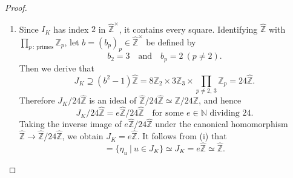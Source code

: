 \documentclass[10pt,a4paper]{amsart}
\begin{document}
\begin{proof}
\begin{enumerate}
\begin{align*}
&=\prod_{i=1}^r[\eta_{u_i},\,\sigma_i]\quad\textrm{by \eqref{etasigma}}\\
&\in [\mathcal{G}_K,\,\mathcal{G}_K].
\end{align*}
This shows that $M\subseteq[\mathcal{G}_K,\,\mathcal{G}_K]$, and hence
\begin{equation*}
[\mathcal{G}_K,\,\mathcal{G}_K]=M=\{\eta_u~|~u\in J_K\}. 
\end{equation*}
\item[(ii)]
Since $I_K$ has index $2$ in $\widehat{\mathbb{Z}}^{\times}$, it contains every square.
Identifying $\widehat{\mathbb{Z}}$ with 
$\prod_{p\,:\,\textrm{primes}}\mathbb{Z}_p$, 
let $b=(b_p)_p\in\widehat{\mathbb{Z}}^{\times}$ be defined by
\begin{equation*}
b_2=3\quad\textrm{and}\quad
b_p=2~(p\neq2).
\end{equation*}
Then we derive that
\begin{equation*}
J_K\supseteq(b^2-1)\widehat{\mathbb{Z}}=
8\mathbb{Z}_2\times3\mathbb{Z}_3
\times\prod_{p\neq2,\,3}\mathbb{Z}_p=
24\widehat{\mathbb{Z}}.
\end{equation*}
Therefore $J_K/24\widehat{\mathbb{Z}}$ is an ideal of $\widehat{\mathbb{Z}}/24\widehat{\mathbb{Z}}
\simeq\mathbb{Z}/24\mathbb{Z}$, and hence
\begin{equation*}
J_K/24\widehat{\mathbb{Z}}=e\widehat{\mathbb{Z}}/24\widehat{\mathbb{Z}}
\quad\textrm{for some $e\in\mathbb{N}$ dividing $24$}. 
\end{equation*}
Taking the inverse 
image of $e\widehat{\mathbb{Z}}/24\widehat{\mathbb{Z}}$
under the canonical homomorphism $\widehat{\mathbb{Z}}\rightarrow\widehat{\mathbb{Z}}
/24\widehat{\mathbb{Z}}$, 
we obtain $J_K=e\widehat{\mathbb{Z}}$. It follows from (i) that
\begin{equation*}
[\mathcal{G}_K,\,\mathcal{G}_K]=\{\eta_u~|~u\in J_K\}\simeq J_K=e\widehat{\mathbb{Z}}\simeq\widehat{\mathbb{Z}}. 
\end{equation*}
\end{enumerate}
\end{proof}
\end{document}
